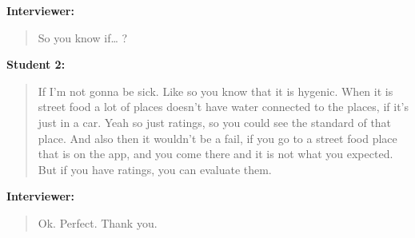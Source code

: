 \textbf{Interviewer:}
\begin{quotation}
    So you know if… ?
\end{quotation}

\textbf{Student 2:}
\begin{quotation}
    If I’m not gonna be sick. Like so you know that it is hygenic. When it is street food a lot of places doesn’t have water connected to the places, if it’s just in a car. Yeah so just ratings, so you could see the standard of that place. And also then it wouldn't be a fail,  if you go to a street food place that is on the app, and you come there and it is not what you expected. But if you have ratings, you can evaluate them.
\end{quotation}

\textbf{Interviewer:}
\begin{quotation}
    Ok. Perfect. Thank you.
\end{quotation}
